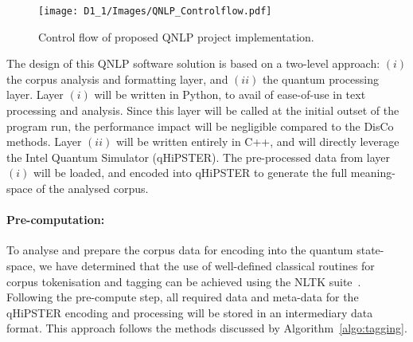 \begin{figure}[!ht]
    \centering
    \texttt{[image: D1\_1/Images/QNLP\_Controlflow.pdf]}
    \caption{Control flow of proposed QNLP project implementation.}
    \label{fig:qnlp_controlflow}
\end{figure}

The design of this QNLP software solution is based on a two-level approach: $(i)$ the corpus analysis and formatting layer, and $(ii)$ the quantum processing layer. Layer $(i)$ will be written in Python, to avail of ease-of-use in text processing and analysis. Since this layer will be called at the initial outset of the program run, the performance impact will be negligible compared to the DisCo methods. Layer $(ii)$ will be written entirely in C++, and will directly leverage the Intel Quantum Simulator (qHiPSTER). The pre-processed data from layer $(i)$ will be loaded, and encoded into qHiPSTER to generate the full meaning-space of the analysed corpus.


\paragraph{Pre-computation:}
To analyse and prepare the corpus data for encoding into the quantum state-space, we have determined that the use of well-defined classical routines for corpus tokenisation and tagging can be achieved using the NLTK suite~\cite{BirdKleinLoper09}. Following the pre-compute step, all required data and meta-data for the qHiPSTER encoding and processing will be stored in an intermediary data format. This approach follows the methods discussed by Algorithm~\ref{algo:tagging}.


